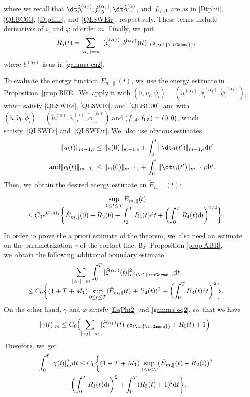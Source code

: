 where we recall that $\dt\check{\phi}_\mathrm{i}^{(\alpha_I)},f_{{\rm i},5}^{(\alpha_I)},\dt\check{\phi}_\mathrm{i,r}^{(\alpha)}$,
and~$f_{{\rm i,r},1}$ are as in \eqref{Dtphii}, \eqref{QLBC00}, \eqref{Dtphiir}, and~\eqref{QLSWEir}, respectively.
These terms include derivatives of $v_\mathrm{i}$ and $\varphi$ of order $m$.
Finally, we~put
\[
R_5(t) = \sum_{|\alpha_I|=m} |(\check{\zeta}_\mathrm{i}^{(\alpha_I)},b^{(\alpha_I)})(t)|_{L^2(\ul{\itGamma})},
\]
where $b^{(\alpha_I)}$ is as in \eqref{gamma eq2}.

To evaluate the energy function $\check{E}_{m,\parallel}(t)$, we~use the energy estimate in Proposition~\ref{prop:BEE}. We~apply it with $(\check{u},\check{v}_\mathrm{i},\check{\psi}_\mathrm{i})=(\check{u}^{(\alpha_I)},\check{v}_\mathrm{i}^{(\alpha_I)},\check{\psi}_\mathrm{i}^{(\alpha_I)})$,
which satisfy \eqref{QLSWEe}, \eqref{QLSWEi}, and~\eqref{QLBC00},
and with $(\check{u},\check{v}_\mathrm{i},\check{\phi}_\mathrm{i})=(\check{u}_\mathrm{r}^{(\alpha)},\check{v}_\mathrm{i,r}^{(\alpha)},\check{\phi}_\mathrm{i,r}^{(\alpha)})$
and $(f_{{\rm i},4},f_{{\rm i},5})=(0,0)$, which satisfy~\eqref{QLSWEr} and~\eqref{QLSWEir}. We~also use obvious estimates
\begin{align*}
\|u(t)\|_{m-1,{\rm e}} &\leq \|u(0)\|_{m-1,{\rm e}}+\int_0^t\|\dt u(t')\|_{m-1,{\rm e}}{\rm d}t'\\
\tag*{and}
\|v_\mathrm{i}(t)\|_{m-1,{\rm i}} &\leq \|v_\mathrm{i}(0)\|_{m-1,{\rm i}}+\int_0^t\|\dt v_\mathrm{i}(t')\|_{m-1,{\rm i}}{\rm d}t'.
\end{align*}
Then, we~obtain the desired energy estimate on $\check{E}_{m,\parallel}(t)$:
\begin{multline}\label{NLEE1}
\sup_{0\leq t\leq T}\check{E}_{m,\parallel}(t)\\[-8pt]
\leq C_0 e^{C_0M_1}\biggl\{ \check{E}_{m,\parallel}(0) + R_2(0) + \int_0^TR_3(t){\rm d}t + \biggl(\int_0^TR_4(t){\rm d}t \biggr)^{1/2} \biggr\}.
\end{multline}

In order to prove the a priori estimate of the theorem, we~also need an estimate on the parametrization $\gamma$ of the contact line. By~Proposition \ref{prop:ABR}, we~obtain the following additional boundary estimate
\begin{multline*}
\sum_{|\alpha_I|=m} \int_0^T |\check{\zeta}^{(\alpha_I)}(t)|_{L^2(\ul{\itGamma})}^2 {\rm d}t \\[-8pt]
\leq C_0\biggl\{ (1+T+M_1)\sup_{0\leq t\leq T}(\check{E}_{m,\parallel}(t) + R_2(t))^2 + \biggl(\int_0^TR_3(t){\rm d}t \biggr)^2 \biggr\}.
\end{multline*}
On the other hand, $\gamma$ and $\varphi$ satisfy \eqref{EqPhi2} and \eqref{gamma eq2}, so~that we have
\[
|\gamma(t)|_m \leq C_0\Bigl(\sum_{|\alpha_I|=m}|\check{\zeta}^{(\alpha_I)}(t)|_{L^2(\ul{\itGamma})} + R_5(t) + 1\Bigr).
\]
Therefore, we~get
\begin{multline}\label{NLEE2}
\int_0^T|\gamma(t)|_m^2{\rm d}t
\leq C_0 \biggl\{ (1+T+M_1)\sup_{0\leq t\leq T}(\check{E}_{m,\parallel}(t) + R_2(t))^2 \\
+ \biggl(\int_0^TR_3(t){\rm d}t \biggr)^2 + \int_0^T (R_5(t) + 1)^2{\rm d}t \biggr\}.
\end{multline}

